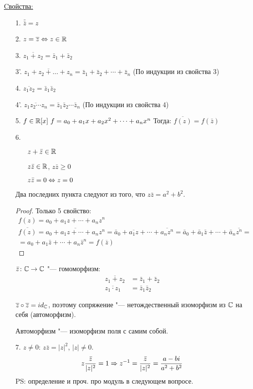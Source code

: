\underline{Cвойства:}
\begin{itemize}
\item[1.] $\bar{\bar z} = z$
\item[2.] $z = \overline{z} \Leftrightarrow z \in \mathbb{R}$
\item[3.] $\overline{z_1 + z_2} = \bar z_1 + \bar z_2$
\item[3'.] $\overline{z_1 + z_2 + \dots + z_n} = \bar z_1 + \bar z_2 + \cdots + \bar z_n$ (По индукции из свойства 3)
\item[4.] $\overline{z_1z_2} = \bar z_1 \bar z_2$
\item[4'.] $\overline{z_1 z_2 \cdots z_n} = \bar z_1 \bar z_2 \cdots \bar z_n$ (По индукции из свойства 4)
\item[5.] $f \in \mathbb{R}[x]~f = a_0 + a_1x + a_2x^2 + \dots + a_nx^n$ Тогда: $\overline{f(z)} = f(\bar z)$
\item[6.] \begin{itemize}
			\item[\bullet] $z + \bar z \in \mathbb{R}$ 
			\item[\bullet] $z \bar z \in \mathbb{R}$, $z \bar z \ge 0$
			\item[\bullet] $z \bar z = 0 \Leftrightarrow z = 0$
		 \end{itemize}	
Два последних пункта следуют из того, что $z \bar z = a^2 + b^2$.
\begin{proof}
Только 5 свойство:
\begin{gather*}
f(z)=a_0 + a_1z + \cdots + a_nz^n \\
\overline{f(z)} = \overline{a_0 + a_1z + \cdots + a_nz^n} = \bar a_0 + \overline{a_1z} + \cdots + \overline{a_nz^n} = \bar a_0 + \bar a_1 \bar z + \cdots + \bar a_n \overline{z^n} = \\
= a_0 + a_1\bar {z} + \cdots + a_n\bar z^n = f(\overline{z})
\end{gather*}
\end{proof}   

$\bar z\colon \mathbb{C} \rightarrow \mathbb{C}$ "--- гомоморфизм:
\begin{align*}
\overline{z_1 + z_2} &= \bar z_1 + \bar z_2 \\
\overline{z_1 \cdot z_1} &= \bar z_1 \bar z_2
\end{align*}

$\overline{z} \circ \overline{z} = id_{\mathbb{C}}$, поэтому сопряжение "--- нетождественный изоморфизм из $\mathbb{C}$ на себя (автоморфизм).
\begin{Def}
Автоморфизм "--- изоморфизм поля с самим собой.
\end{Def}
\item[7.] $z \ne 0$: $z \bar z = |z|^2$, $|z| \ne 0$.
\begin{gather*}
z \frac{\bar z}{|z|^2} = 1 \Rightarrow z^{-1} = \frac{\bar z}{|z|^2} = \frac{a - bi}{a^2 + b^2}
\end{gather*}
PS: определение и проч. про модуль в следующем вопросе.
\end{itemize}


